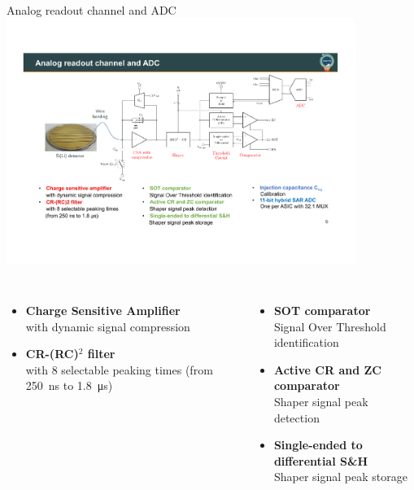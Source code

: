 \documentclass[aspectratio=169,xcolor=dvipsnames]{beamer} %
\begin{document}

\begin{frame}{Analog readout channel and ADC}
    \fontsize{8.5pt}{1}\selectfont
    \addtolength{\leftmargini}{\labelsep}
    \centering
    \includegraphics[width=0.85\textwidth]{images/backup_slides/schematico_detector.pdf}
    \vskip0.3cm
    \begin{columns}[T]
            \begin{itemize}
                \item \textbf{Charge Sensitive Amplifier}\\ with dynamic signal compression
                \item \textbf{CR-(RC)$^{2}$ filter}\\ with 8 selectable peaking times (from \SI{250}{\nano\second} to \SI{1.8}{\micro\second})
            \end{itemize}
            
            \begin{itemize}
                \item \textbf{SOT comparator}\\ Signal Over Threshold identification
                \item \textbf{Active CR and ZC comparator}\\ Shaper signal peak detection
                \item \textbf{Single-ended to differential S\&H}\\ Shaper signal peak storage
            \end{itemize}
        

\end{columns}
\end{frame}
\end{document}
